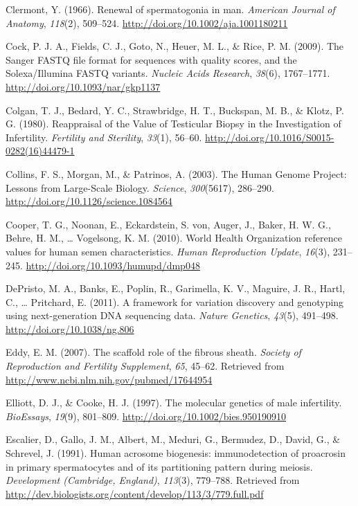 \documentclass[12pt,twoside]{reedthesis}
\theoremstyle{definition}
\theoremstyle{definition}
\theoremstyle{remark}
\begin{document}
  \hypertarget{ref-Clermont1966}{}
  Clermont, Y. (1966). Renewal of spermatogonia in man. \emph{American
  Journal of Anatomy}, \emph{118}(2), 509--524.
  \url{http://doi.org/10.1002/aja.1001180211}
  
  \hypertarget{ref-Cock2009}{}
  Cock, P. J. A., Fields, C. J., Goto, N., Heuer, M. L., \& Rice, P. M.
  (2009). The Sanger FASTQ file format for sequences with quality scores,
  and the Solexa/Illumina FASTQ variants. \emph{Nucleic Acids Research},
  \emph{38}(6), 1767--1771. \url{http://doi.org/10.1093/nar/gkp1137}
  
  \hypertarget{ref-Colgan1980}{}
  Colgan, T. J., Bedard, Y. C., Strawbridge, H. T., Buckspan, M. B., \&
  Klotz, P. G. (1980). Reappraisal of the Value of Testicular Biopsy in
  the Investigation of Infertility. \emph{Fertility and Sterility},
  \emph{33}(1), 56--60. \url{http://doi.org/10.1016/S0015-0282(16)44479-1}
  
  \hypertarget{ref-Collins2003}{}
  Collins, F. S., Morgan, M., \& Patrinos, A. (2003). The Human Genome
  Project: Lessons from Large-Scale Biology. \emph{Science},
  \emph{300}(5617), 286--290. \url{http://doi.org/10.1126/science.1084564}
  
  \hypertarget{ref-Cooper2010}{}
  Cooper, T. G., Noonan, E., Eckardstein, S. von, Auger, J., Baker, H. W.
  G., Behre, H. M., \ldots{} Vogelsong, K. M. (2010). World Health
  Organization reference values for human semen characteristics.
  \emph{Human Reproduction Update}, \emph{16}(3), 231--245.
  \url{http://doi.org/10.1093/humupd/dmp048}
  
  \hypertarget{ref-DePristo2011}{}
  DePristo, M. A., Banks, E., Poplin, R., Garimella, K. V., Maguire, J.
  R., Hartl, C., \ldots{} Pritchard, E. (2011). A framework for variation
  discovery and genotyping using next-generation DNA sequencing data.
  \emph{Nature Genetics}, \emph{43}(5), 491--498.
  \url{http://doi.org/10.1038/ng.806}
  
  \hypertarget{ref-Eddy2007}{}
  Eddy, E. M. (2007). The scaffold role of the fibrous sheath.
  \emph{Society of Reproduction and Fertility Supplement}, \emph{65},
  45--62. Retrieved from \url{http://www.ncbi.nlm.nih.gov/pubmed/17644954}
  
  \hypertarget{ref-Elliott1997}{}
  Elliott, D. J., \& Cooke, H. J. (1997). The molecular genetics of male
  infertility. \emph{BioEssays}, \emph{19}(9), 801--809.
  \url{http://doi.org/10.1002/bies.950190910}
  
  \hypertarget{ref-Escalier1991}{}
  Escalier, D., Gallo, J. M., Albert, M., Meduri, G., Bermudez, D., David,
  G., \& Schrevel, J. (1991). Human acrosome biogenesis: immunodetection
  of proacrosin in primary spermatocytes and of its partitioning pattern
  during meiosis. \emph{Development (Cambridge, England)}, \emph{113}(3),
  779--788. Retrieved from
  \url{http://dev.biologists.org/content/develop/113/3/779.full.pdf}
  
\end{document}
